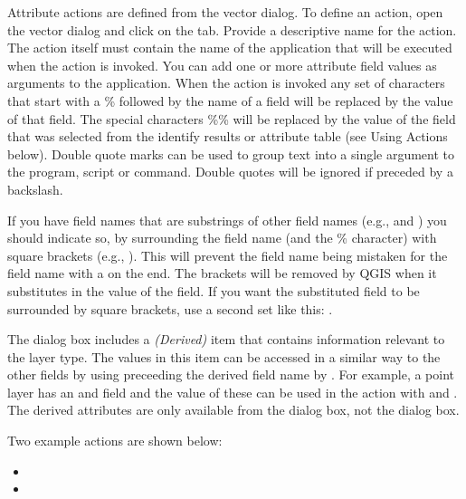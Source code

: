 Attribute actions are defined from the vector  dialog. To
define an action, open the vector  dialog and click on the
 tab. Provide a descriptive name for the action. The action
itself must contain the name of the application that will be executed when the
action is invoked. You can add one or more attribute field values as arguments
to the application. When the action is invoked any set of characters that
start with a \% followed by the name of a field will be replaced by the value of
that field. The special characters \%\% \index{\%\%}will be replaced by the value
of the field that was selected from the identify results or attribute table (see
Using Actions below).  Double quote marks can be used to group text into a
single argument to the program, script or command. Double quotes will be
ignored if preceded by a backslash.

If you have field names that are substrings of other field names (e.g., 
and ) you should
indicate so, by surrounding the field name (and the \% character) with square
brackets (e.g., \usertext{[\%col10]}). This will prevent the  field
name being mistaken for the  field name with a 
on the end. The brackets will be removed by QGIS when it substitutes in the
value of the field. If you want the substituted field to be surrounded by square
brackets, use a second set like this: \usertext{[[\%col10]]}.

The  dialog box includes a {\em (Derived)} item that
contains information relevant to the layer type. The
values in this item can be accessed in a similar way to the other fields
by using preceeding the derived field name by . For
example, a point layer has an  and  field and the
value of these can be used in the action with  and
. The derived attributes are only available from the
 dialog box, not the  dialog box.

Two example actions are shown below:

\begin{itemize}[label=--]
  \item {}
  \item {}
\end{itemize}

